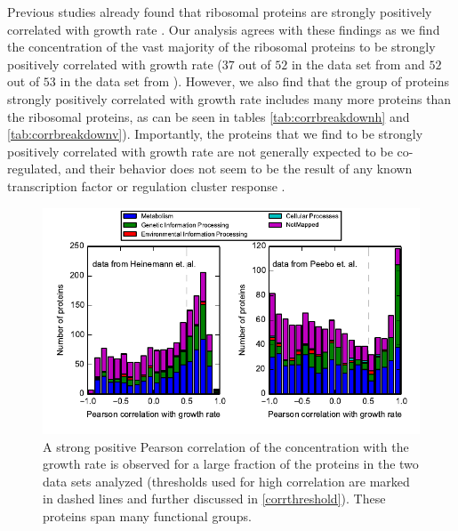\documentclass[a4paper]{article}
\newcommand{\hRibs}{$52$}
\newcommand{\hCorrRibs}{$37$}
\newcommand{\vnRibs}{$53$}
\newcommand{\vRibs}{\vnRibs{}}
\newcommand{\vnCorrRibs}{$52$}
\newcommand{\vCorrRibs}{\vnCorrRibs{}}
\begin{document}
Previous studies already found that ribosomal proteins are strongly positively correlated with growth rate \cite{Pedersen1978a, ingraham1983growth, Klumpp2008}.
Our analysis agrees with these findings as we find the concentration of the vast majority of the ribosomal proteins to be strongly positively correlated with growth rate (\hCorrRibs{} out of \hRibs{} in the data set from \cite{Heinemann2015} and \vCorrRibs{} out of \vRibs{} in the data set from \cite{Peebo_2015}).
However, we also find that the group of proteins strongly positively correlated with growth rate includes many more proteins than the ribosomal proteins, as can be seen in tables \ref{tab:corrbreakdownh} and \ref{tab:corrbreakdownv}).
Importantly, the proteins that we find to be strongly positively correlated with growth rate are not generally expected to be co-regulated, and their behavior does not seem to be the result of any known transcription factor or regulation cluster response \cite{23203884}.

\begin{figure}[H]
\begin{center}
\includegraphics[width=1\columnwidth]{GrowthRateCorrelation.pdf}
\caption{\label{fig:growthcorr}
A strong positive Pearson correlation of the concentration with the growth rate is observed for a large fraction of the proteins in the two data sets analyzed (thresholds used for high correlation are marked in dashed lines and further discussed in \ref{corrthreshold}).
These proteins span many functional groups.
}
\end{center}
\end{figure}
\end{document}
